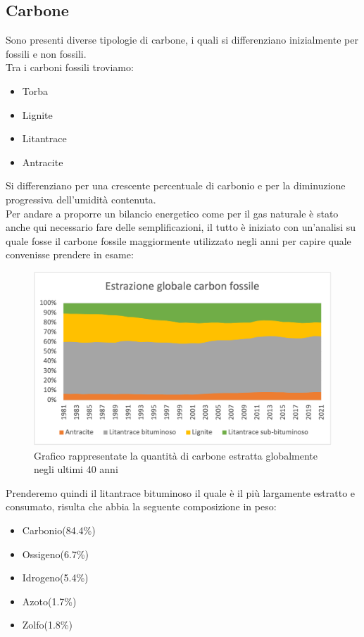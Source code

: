 \subsection{Carbone}
Sono presenti diverse tipologie di carbone, i quali si differenziano inizialmente per fossili e non fossili.\\
Tra i carboni fossili troviamo:
\begin{itemize}
    \item Torba
    \item Lignite
    \item Litantrace
    \item Antracite
\end{itemize}
Si differenziano per una crescente percentuale di carbonio e per la diminuzione progressiva dell'umidità contenuta.\\
Per andare a proporre un bilancio energetico come per il gas naturale è stato anche qui necessario fare delle semplificazioni, il tutto è iniziato con un'analisi su quale fosse il carbone fossile maggiormente utilizzato negli anni per capire quale convenisse prendere in esame:\cite{EIA-Statistics-World}\\
\begin{figure}[H]
    \centering
    \includegraphics[height=0.6\textwidth]{res/cap2/Grafico carbone.png}
    \caption{Grafico rappresentate la quantità di carbone estratta globalmente negli ultimi 40 anni}
\end{figure}\noindent
Prenderemo quindi il litantrace bituminoso il quale è il più largamente estratto e consumato, risulta che abbia la seguente composizione in peso:\cite{Composizione-antracite}\\
\begin{itemize}
    \item Carbonio(84.4\%)
    \item Ossigeno(6.7\%)
    \item Idrogeno(5.4\%)
    \item Azoto(1.7\%)
    \item Zolfo(1.8\%)
\end{itemize}
